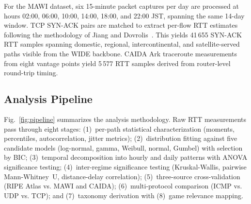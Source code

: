 \documentclass[conference]{IEEEtran}
\begin{document}
For the MAWI dataset, six 15-minute packet captures per day are processed at hours 02:00, 06:00, 10:00, 14:00, 18:00, and 22:00 JST, spanning the same 14-day window. TCP SYN-ACK pairs are matched to extract per-flow RTT estimates following the methodology of Jiang and Dovrolis~\cite{jiang2002}. This yields 41\,655 SYN-ACK RTT samples spanning domestic, regional, intercontinental, and satellite-served paths visible from the WIDE backbone. CAIDA Ark traceroute measurements from eight vantage points yield 5\,577 RTT samples derived from router-level round-trip timing.

\subsection{Analysis Pipeline}

Fig.~\ref{fig:pipeline} summarizes the analysis methodology. Raw RTT measurements pass through eight stages: (1)~per-path statistical characterization (moments, percentiles, autocorrelation, jitter metrics); (2)~distribution fitting against five candidate models (log-normal, gamma, Weibull, normal, Gumbel) with selection by BIC; (3)~temporal decomposition into hourly and daily patterns with ANOVA significance testing; (4)~inter-regime significance testing (Kruskal-Wallis, pairwise Mann-Whitney~U, distance-delay correlation); (5)~three-source cross-validation (RIPE Atlas vs. MAWI and CAIDA); (6)~multi-protocol comparison (ICMP vs. UDP vs. TCP); and (7)~taxonomy derivation with (8)~game relevance mapping.
\end{document}
